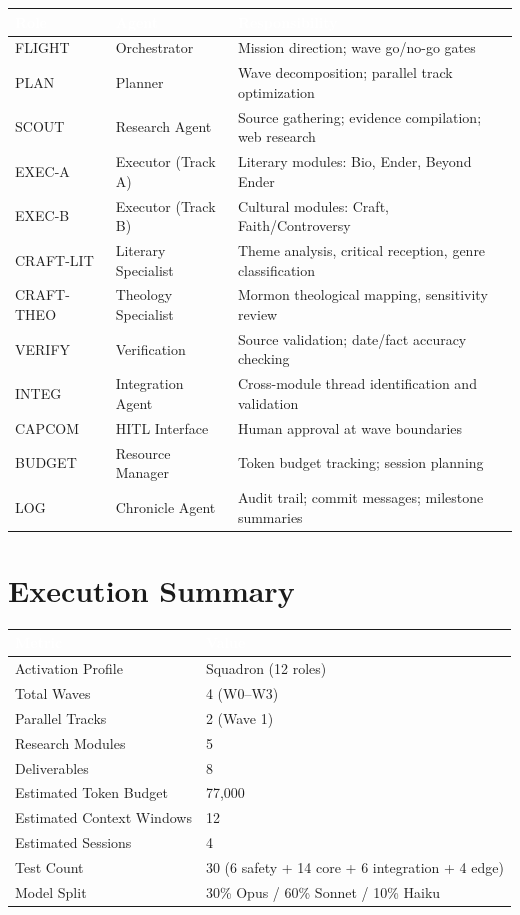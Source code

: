 \documentclass[11pt,letterpaper]{article}
\newcommand{\tableheader}[1]{\textbf{\sffamily\textcolor{white}{#1}}}
\begin{document}
\begin{center}
\begin{tabularx}{\textwidth}{L{2cm}L{2.5cm}X}
\toprule
{}
\tableheader{Role} & \tableheader{Agent} & \tableheader{Responsibility} \\
\midrule
FLIGHT & Orchestrator & Mission direction; wave go/no-go gates \\
PLAN & Planner & Wave decomposition; parallel track optimization \\
SCOUT & Research Agent & Source gathering; evidence compilation; web research \\
EXEC-A & Executor (Track A) & Literary modules: Bio, Ender, Beyond Ender \\
EXEC-B & Executor (Track B) & Cultural modules: Craft, Faith/Controversy \\
CRAFT-LIT & Literary Specialist & Theme analysis, critical reception, genre classification \\
CRAFT-THEO & Theology Specialist & Mormon theological mapping, sensitivity review \\
VERIFY & Verification & Source validation; date/fact accuracy checking \\
INTEG & Integration Agent & Cross-module thread identification and validation \\
CAPCOM & HITL Interface & Human approval at wave boundaries \\
BUDGET & Resource Manager & Token budget tracking; session planning \\
LOG & Chronicle Agent & Audit trail; commit messages; milestone summaries \\
\bottomrule
\end{tabularx}
\end{center}

\section{Execution Summary}

\begin{center}
\begin{tabularx}{\textwidth}{L{5cm}X}
\toprule
{}
\tableheader{Metric} & \tableheader{Value} \\
\midrule
Activation Profile & Squadron (12 roles) \\
Total Waves & 4 (W0--W3) \\
Parallel Tracks & 2 (Wave 1) \\
Research Modules & 5 \\
Deliverables & 8 \\
Estimated Token Budget & 77,000 \\
Estimated Context Windows & 12 \\
Estimated Sessions & 4 \\
Test Count & 30 (6 safety + 14 core + 6 integration + 4 edge) \\
Model Split & 30\% Opus / 60\% Sonnet / 10\% Haiku \\
\bottomrule
\end{tabularx}
\end{center}
\end{document}
